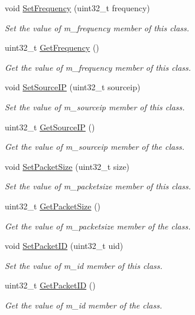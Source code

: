 \begin{DoxyCompactItemize}
void \hyperlink{classns3_1_1NamedContentCacheEntry_a3332e854b9c7973b6034ca7dac09aefe}{Set\-Frequency} (uint32\-\_\-t frequency)
\begin{DoxyCompactList}\small\item\em Set the value of m\-\_\-frequency member of this class. \end{DoxyCompactList}\item 
uint32\-\_\-t \hyperlink{classns3_1_1NamedContentCacheEntry_a83b9aca366e96360e76a381bfd44d8c3}{Get\-Frequency} ()
\begin{DoxyCompactList}\small\item\em Get the value of m\-\_\-frequency member of this class. \end{DoxyCompactList}\item 
void \hyperlink{classns3_1_1NamedContentCacheEntry_a9b3099156c034d621a13e9c03c797442}{Set\-Source\-I\-P} (uint32\-\_\-t sourceip)
\begin{DoxyCompactList}\small\item\em Set the value of m\-\_\-sourceip member of this class. \end{DoxyCompactList}\item 
uint32\-\_\-t \hyperlink{classns3_1_1NamedContentCacheEntry_a2928365f18436bab7752ff46bdd8ebfb}{Get\-Source\-I\-P} ()
\begin{DoxyCompactList}\small\item\em Get the value of m\-\_\-sourceip member of the class. \end{DoxyCompactList}\item 
void \hyperlink{classns3_1_1NamedContentCacheEntry_a5cd007df603a942c6a6ee15741fb91df}{Set\-Packet\-Size} (uint32\-\_\-t size)
\begin{DoxyCompactList}\small\item\em Set the value of m\-\_\-packetsize member of this class. \end{DoxyCompactList}\item 
uint32\-\_\-t \hyperlink{classns3_1_1NamedContentCacheEntry_af364d4dddf9c79193358f114ec0e8e6a}{Get\-Packet\-Size} ()
\begin{DoxyCompactList}\small\item\em Get the value of m\-\_\-packetsize member of the class. \end{DoxyCompactList}\item 
void \hyperlink{classns3_1_1NamedContentCacheEntry_ac37f4e91f9d92b72d2ede611818406da}{Set\-Packet\-I\-D} (uint32\-\_\-t uid)
\begin{DoxyCompactList}\small\item\em Set the value of m\-\_\-id member of this class. \end{DoxyCompactList}\item 
uint32\-\_\-t \hyperlink{classns3_1_1NamedContentCacheEntry_a7b3ef837f4422e9d4152e3c458e194d7}{Get\-Packet\-I\-D} ()
\begin{DoxyCompactList}\small\item\em Get the value of m\-\_\-id member of the class. \end{DoxyCompactList}\end{DoxyCompactItemize}
